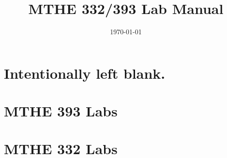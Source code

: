 \documentclass[letterpaper,11pt,openany]{book}
\title{MTHE 332/393 Lab Manual}
\date{\today}
\begin{document}
\maketitle

\tableofcontents

\part*{\small Intentionally left blank.}


\part{MTHE 393 Labs}






\part{MTHE 332 Labs}







\appendix



\end{document}
